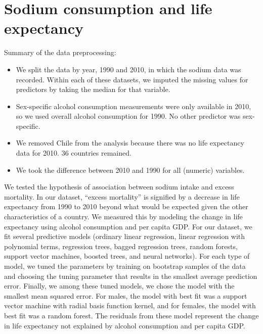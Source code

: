 \documentclass{article}
\begin{document}
\let\thefootnote\relax{}

\section{Sodium consumption and life expectancy}

Summary of the data preprocessing:
\begin{itemize}
\item We split the data by year, 1990 and 2010, in which the sodium data was recorded. Within each of these datasets, we imputed the missing values for predictors by taking the median for that variable.
\item Sex-specific alcohol consumption measurements were only available in 2010, so we used overall alcohol consumption for 1990. No other predictor was sex-specific. 
\item We removed Chile from the analysis because there was no life expectancy data for 2010. 36 countries remained.
\item	We took the difference between 2010 and 1990 for all (numeric) variables.
\end{itemize}

We tested the hypothesis of association between sodium intake and excess mortality.  In our dataset, ``excess mortality'' is signified by a decrease in life expectancy from 1990 to 2010 beyond what would be expected given the other characteristics of a country.  We measured this by modeling the change in life expectancy using alcohol consumption and per capita GDP.  For our dataset, we fit several predictive models (ordinary linear regression, linear regression with polynomial terms, regression trees, bagged regression trees, random forests, support vector machines, boosted trees, and neural networks).  For each type of model, we tuned the parameters by training on bootstrap samples of the data and choosing the tuning parameter that results in the smallest average prediction error.  Finally, we among these tuned models, we chose the model with the smallest mean squared error.  For males, the model with best fit was a support vector machine with radial basis function kernel, and for females, the model with best fit was a random forest.  The residuals from these model represent the change in life expectancy not explained by alcohol consumption and per capita GDP. \\
\end{document}
